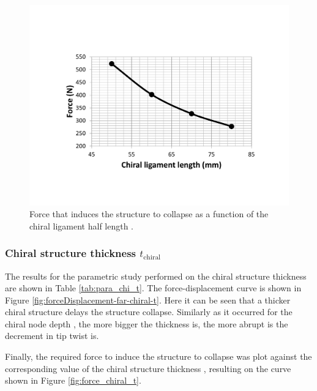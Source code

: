       \begin{figure}[!htpb] %
        \centering
        \includegraphics[width=0.8 \textwidth]{../figures/result-sim/L/force_L}
        \caption[Force that induces the structure to collapse as a function of the chiral ligament half length]{Force that induces the structure to collapse as a function of the chiral ligament half length \chiL.}\label{fig:force_L}
      \end{figure}

    \clearpage
    \subsubsection{Chiral structure thickness $t_{\mathrm{chiral}}$}

      The results for the parametric study performed on the chiral structure thickness \chit are shown in Table \ref{tab:para_chi_t}. The force-displacement curve is shown in Figure \ref{fig:forceDisplacement-far-chiral-t}. Here it can be seen that a thicker chiral structure delays the structure collapse. Similarly as it occurred for the chiral node depth \chiB, the more bigger the thickness \chit is, the more abrupt is the decrement in tip twist is.

      Finally, the required force to induce the structure to collapse was plot against the corresponding value of the chiral structure thickness \chit, resulting on the curve shown in Figure \ref{fig:force_chiral_t}.

